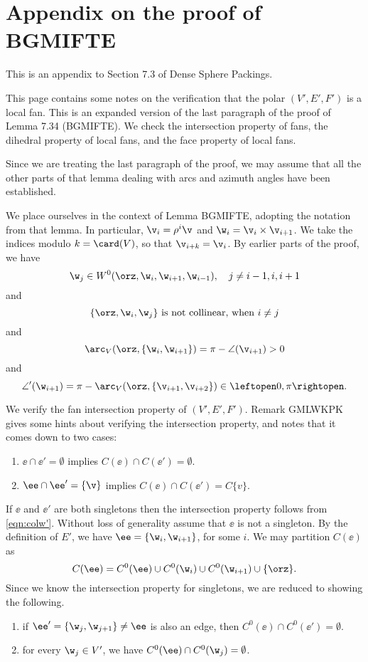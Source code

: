 \newpage
\section{Appendix on the proof of BGMIFTE}

This is an appendix to Section 7.3 of Dense Sphere Packings.

This page contains some notes on the verification that the polar $(V',E',F')$ is
a local fan.   This is an expanded version of  the last paragraph
of the proof of Lemma 7.34 (BGMIFTE).
We check the intersection property of fans, the dihedral property
of local fans, and the face property of local fans.

Since we are treating the last paragraph of the
proof, we may assume that all the other parts of that lemma dealing
with arcs and azimuth angles have been established.

We place ourselves in the context of Lemma BGMIFTE, adopting the
notation from that lemma.  
In particular, $\v_i = \rho^i\v$ and
$\w_i = \v_i \times \v_{i+1}$.  
We take the indices modulo $k=\card(V)$, so that $\v_{i+k}=\v_i$.
By earlier parts of the proof, we have
\begin{equation}\label{eqn:wj'}
\w_j\in W^0(\orz,\w_{i},\w_{i+1},\w_{i-1}),\quad j\ne i-1, i, i+1
\end{equation}
and
\begin{equation}\label{eqn:colw'}
\{\orz,\w_i,\w_j\} \text{ is not collinear, when } i\ne j
\end{equation}  
and
\begin{equation}\label{eqn:arcV'}
\arc_V(\orz,\{\w_i,\w_{i+1}\}) 
=\pi - \angle(\v_{i+1}) >0
\end{equation}
and
\begin{equation}\label{eqn:angle'}
\angle'(\w_{i+1}) 
=\pi -\arc_V(\orz,\{\v_{i+1},\v_{i+2}\})  \in\leftopen 0,\pi\rightopen.
\end{equation}

We verify the fan intersection property of $(V',E',F')$.  Remark GMLWKPK gives
some hints about verifying the intersection property, and notes that it comes
down to two cases:
\begin{enumerate}
\item $\ee\cap \ee' = \emptyset$ implies $C(\ee)\cap C(\ee') = \emptyset$.
\item $\ee\cap\ee' = \{\v\}$ implies $C(\ee)\cap C(\ee') = C\{v\}$.
\end{enumerate}
If $\ee$ and $\ee'$ are both singletons then the intersection property
follows from \eqref{eqn:colw'}.  Without loss of generality assume that $\ee$ is
not a singleton.  By the definition of $E'$, we have 
 $\ee=\{\w_i,\w_{i+1} \}$, for some $i$.  We may partition $C(\ee)$ as
\[
C(\ee) = C^0(\ee) \cup C^0(\w_i) \cup C^0(\w_{i+1})\cup \{\orz\}.
\]
Since we know the intersection property for singletons, we are reduced to showing
the following.
\begin{enumerate}
\item if $\ee'=\{\w_j,\w_{j+1}\}\ne\ee$ is also an edge, then  $C^0(\ee)\cap C^0(\ee')=\emptyset$.
\item for every $\w_j\in V'$, we have $C^0(\ee) \cap C^0(\w_j)=\emptyset$.
\end{enumerate}


